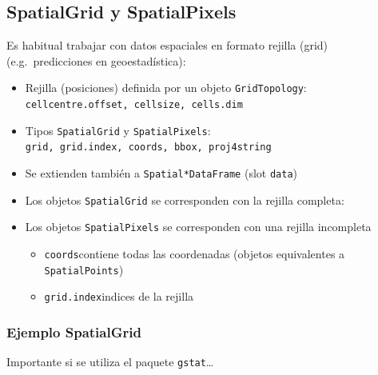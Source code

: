 \documentclass[
  spanish,
]{book}
\theoremstyle{break}
\begin{document}
\hypertarget{spatialgrid-y-spatialpixels}{%
\subsection{SpatialGrid y SpatialPixels}\label{spatialgrid-y-spatialpixels}}

Es habitual trabajar con datos espaciales en formato
rejilla (grid) (e.g.~predicciones en geoestadística):

\begin{itemize}
\item
  Rejilla (posiciones) definida por un objeto \texttt{GridTopology}:
  \texttt{cellcentre.offset,\ cellsize,\ cells.dim}
\item
  Tipos \texttt{SpatialGrid} y \texttt{SpatialPixels}:
  \texttt{grid,\ grid.index,\ coords,\ bbox,\ proj4string}
\item
  Se extienden también a \texttt{Spatial*DataFrame} (slot \texttt{data})
\item
  Los objetos \texttt{SpatialGrid} se corresponden con la rejilla completa:
\item
  Los objetos \texttt{SpatialPixels} se corresponden con una rejilla
  incompleta

  \begin{itemize}
  \item
    \texttt{coords}contiene todas las coordenadas (objetos equivalentes a
    \texttt{SpatialPoints})
  \item
    \texttt{grid.index}indices de la rejilla
  \end{itemize}
\end{itemize}

\hypertarget{ejemplo-spatialgrid}{%
\subsubsection{Ejemplo SpatialGrid}\label{ejemplo-spatialgrid}}

Importante si se utiliza el paquete \texttt{gstat}\ldots{}
\end{document}
